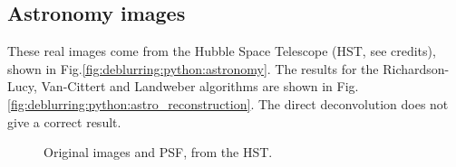 \newpage

\subsection{Astronomy images}
These real images come from the Hubble Space Telescope (HST, see credits), shown in Fig.\ref{fig:deblurring:python:astronomy}. The results for the Richardson-Lucy, Van-Cittert and Landweber algorithms are shown in Fig.\ref{fig:deblurring:python:astro_reconstruction}. The direct deconvolution does not give a correct result.

\begin{figure}[htbp]
\centering\caption{Original images and PSF, from the HST.}
\hfill
{}


\end{figure}

